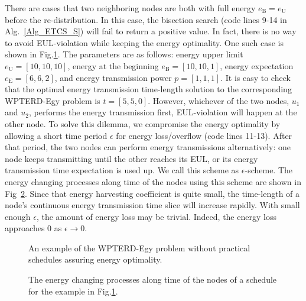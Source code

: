 \documentclass[journal,10pt]{IEEEtran}
\begin{document}
There are cases that two neighboring nodes are both with full energy $e_\text{B}{=}e_\text{U}$ before the re-distribution. In this case, the bisection search (code lines 9-14 in Alg.~\ref{Alg_ETCS_S}) will fail to return a positive value. In fact, there is no way to avoid EUL-violation while keeping the energy optimality. One such case is shown in Fig.\ref{fig_full}. The parameters are as follows: energy upper limit $e_\text{U}{=}[10,10,10]$, energy at the beginning $e_\text{B}{=}[10,10,1]$, energy expectation $e_\text{E}{=}[6,6,2]$, and energy transmission power $p{=}[1,1,1]$. It is easy to check that the optimal energy transmission time-length solution to the corresponding WPTERD-Egy problem is $t{=}[5,5,0]$. However, whichever of the two nodes, $u_1$ and $u_2$, performs the energy transmission first, EUL-violation will happen at the other node. To solve this dilemma, we compromise the energy optimality by allowing a short time period $\epsilon$ for energy loss/overflow (code lines 11-13). After that period, the two nodes can perform energy transmissions alternatively: one node keeps transmitting until the other reaches its EUL, or its energy transmission time expectation is used up. We call this scheme as $\epsilon${-}scheme. The energy changing processes along time of the nodes using this scheme are shown in Fig~\ref{fig_full_sch}. Since that energy harvesting coefficient is quite small, the time-length of a node's continuous energy transmission time slice will increase rapidly. With small enough $\epsilon$, the amount of energy loss may be trivial. Indeed, the energy loss approaches 0 as $\epsilon{\rightarrow}0$.

\begin{figure}[htb]
\caption{An example of the WPTERD-Egy problem without practical schedules assuring energy optimality.}
\label{fig_full}
\end{figure}

\vspace{-4mm}
\begin{figure}[htb]
\caption{The energy changing processes along time of the nodes of a schedule for the example in Fig.\ref{fig_full}.}
\label{fig_full_sch}
\end{figure}
\end{document}
